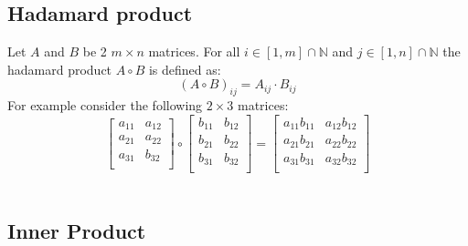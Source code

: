 \documentclass[12pt]{article}
\begin{document}
\subsection{Hadamard product}\label{sec:hadamerd_product}
Let \(A\) and \(B\) be 2 \(m \times n\) matrices. For all \(i \in [1, m]\cap\mathbb N\) and \(j \in [1, n]\cap\mathbb N\)
the hadamard product \(A \circ B\) is defined as:
\begin{equation} \label{eq:defs:Hadamard product}
\left(A \circ B\right)_{ij} = A_{ij} \cdot B_{ij}
\end{equation}
For example consider the following \(2 \times 3\) matrices:
\[
\left[
\begin{array}{ll}
a_{11} & a_{12} \\
a_{21} & a_{22} \\
a_{31} & b_{32} \\
\end{array}
\right] \circ 
\left[
\begin{array}{ll}
b_{11} & b_{12} \\
b_{21} & b_{22} \\
b_{31} & b_{32} \\
\end{array}
\right] = 
\left[
\begin{array}{ll}
a_{11}b_{11} & a_{12}b_{12} \\
a_{21}b_{21} & a_{22}b_{22} \\
a_{31}b_{31} & a_{32}b_{32} \\
\end{array}
\right]
\]\\

\subsection{Inner Product}
\end{document}
